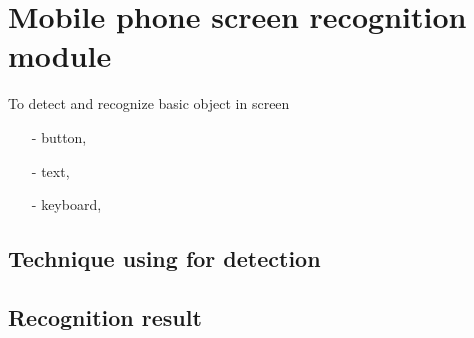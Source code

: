 \chapter{Mobile phone screen recognition module}
To detect and recognize basic object in screen
\begin{itemize}
	\item[-] button,
	\item[-] text,
	\item[-] keyboard,
\end{itemize}

\section{Technique using for detection}
\section{Recognition result}
